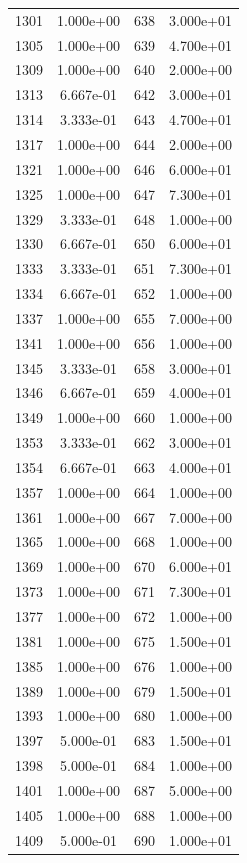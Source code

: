 \documentclass[12pt]{article}
\begin{document}
\begin{longtable}{@{}cccc@{}}
1301 & 1.000e+00 & 638 & 3.000e+01 \\
1305 & 1.000e+00 & 639 & 4.700e+01 \\
1309 & 1.000e+00 & 640 & 2.000e+00 \\
1313 & 6.667e-01 & 642 & 3.000e+01 \\
1314 & 3.333e-01 & 643 & 4.700e+01 \\
1317 & 1.000e+00 & 644 & 2.000e+00 \\
1321 & 1.000e+00 & 646 & 6.000e+01 \\
1325 & 1.000e+00 & 647 & 7.300e+01 \\
1329 & 3.333e-01 & 648 & 1.000e+00 \\
1330 & 6.667e-01 & 650 & 6.000e+01 \\
1333 & 3.333e-01 & 651 & 7.300e+01 \\
1334 & 6.667e-01 & 652 & 1.000e+00 \\
1337 & 1.000e+00 & 655 & 7.000e+00 \\
1341 & 1.000e+00 & 656 & 1.000e+00 \\
1345 & 3.333e-01 & 658 & 3.000e+01 \\
1346 & 6.667e-01 & 659 & 4.000e+01 \\
1349 & 1.000e+00 & 660 & 1.000e+00 \\
1353 & 3.333e-01 & 662 & 3.000e+01 \\
1354 & 6.667e-01 & 663 & 4.000e+01 \\
1357 & 1.000e+00 & 664 & 1.000e+00 \\
1361 & 1.000e+00 & 667 & 7.000e+00 \\
1365 & 1.000e+00 & 668 & 1.000e+00 \\
1369 & 1.000e+00 & 670 & 6.000e+01 \\
1373 & 1.000e+00 & 671 & 7.300e+01 \\
1377 & 1.000e+00 & 672 & 1.000e+00 \\
1381 & 1.000e+00 & 675 & 1.500e+01 \\
1385 & 1.000e+00 & 676 & 1.000e+00 \\
1389 & 1.000e+00 & 679 & 1.500e+01 \\
1393 & 1.000e+00 & 680 & 1.000e+00 \\
1397 & 5.000e-01 & 683 & 1.500e+01 \\
1398 & 5.000e-01 & 684 & 1.000e+00 \\
1401 & 1.000e+00 & 687 & 5.000e+00 \\
1405 & 1.000e+00 & 688 & 1.000e+00 \\
1409 & 5.000e-01 & 690 & 1.000e+01 \\

\end{longtable}
\end{document}
